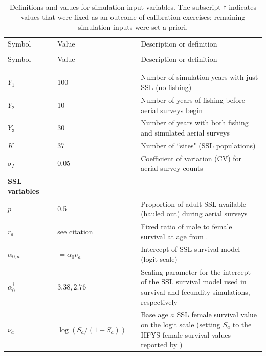 \documentclass[nonumbib,leqno]{nrc1}
\begin{document}
\begin{longtable}{p{2.5cm}lp{2.5cm}l p{8cm}}
\caption[Parameters]{ \large Definitions and values for simulation input variables.  The subscript $\dag$
indicates values that were fixed as an outcome of calibration exercises; remaining simulation inputs were
set a priori.}
\label{tab:inputs} \\
\hline \hline
Symbol & & Value & & Description or definition \\
\cline{1-1} \cline{3-3} \cline{5-5} \\
\endfirsthead
\hline \hline
Symbol & & Value & & Description or definition \\
\cline{1-1} \cline{3-3} \cline{5-5} \\
\endhead
\hline
\endfoot
\hline
\endlastfoot
\multicolumn{1}{l}{\textbf{Survey variables}}  \\
$Y_1$ & & 100 & & Number of simulation years with just SSL (no fishing) \\
$Y_2$ & & 10 & & Number of years of fishing before aerial surveys begin \\
$Y_3$ & & 30 & & Number of years with both fishing and simulated aerial surveys \\
$K$ & & 37 & & Number of ``sites" (SSL populations)  \\
$\sigma_I$ & & 0.05 & & Coefficient of variation (CV) for aerial survey counts \\
\midrule
\multicolumn{1}{l}{\textbf{SSL variables}}  \\
$p$ & & 0.5 & & Proportion of adult SSL available (hauled out) during aerial surveys \\
$r_a$ & & see citation & & Fixed ratio
of male to female survival at age from \citet{CalkinsPitcher1982}. \\
$\alpha_{0,a}$ & & $=\alpha_0 \nu_a $ & & Intercept of SSL survival model (logit scale) \\
$\alpha_0^\dag$ & & $3.38,2.76$ & & Scaling parameter for the intercept of the SSL survival model used in
                                    survival and fecundity simulations, respectively\\
$\nu_a $ & & $\log(S_a/(1-S_a))$ & & Base age $a$ SSL female survival value on the logit scale (setting $S_a$ to the HFYS female survival values reported by \citet{HolmesEtAl2007})  \\

\end{longtable}
\end{document}
